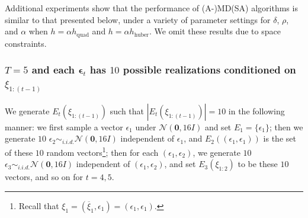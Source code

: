 \documentclass[11pt,fullpage,letterpaper]{article}
\newcommand{\mc}{\mathcal}
\newcommand{\mb}{\mathbf}
\begin{document}
Additional experiments show that the performance of (A-)MD(SA) algorithms is similar to that presented below, under a variety of parameter settings for $\delta$, $\rho$, and $\alpha$ when $h= \alpha h_{\text{quad}}$ and $h= \alpha h_{\text{huber}}$. We omit these results due to space constraints. 

\subsubsection{$T = 5$ and each $\boldsymbol{\epsilon}_t$ has $10$ possible realizations conditioned on $\xi_{1:(t-1)}$}\label{sec:soco-exp}

We generate $E_t(\xi_{1:(t-1)})$ such that $|E_t(\xi_{1:(t-1)})| = 10$ in the following manner: we first sample a vector $\epsilon_1$ under $\mc N(\mb 0,16 I)$ and set $E_1 = \{\epsilon_1\}$; then we generate $10$ $\epsilon_2\sim_{i.i.d.} \mc N(\mb 0,16 I)$ independent of $\epsilon_1$, and $E_2((\epsilon_1,\epsilon_1))$ is the set of these $10$ random vectors\footnote{Recall that $\xi_1 = (\overline{\xi}_1,\epsilon_1) = (\epsilon_1,\epsilon_1)$.}; then for each $(\epsilon_1,\epsilon_2)$, we generate $10$ $\epsilon_3\sim_{i.i.d.} \mc N(\mb 0,16 I)$ independent of $(\epsilon_1,\epsilon_2)$, and set $E_3(\xi_{1:2})$ to be these $10$ vectors, and so on for $t=4,5$. 
\end{document}
